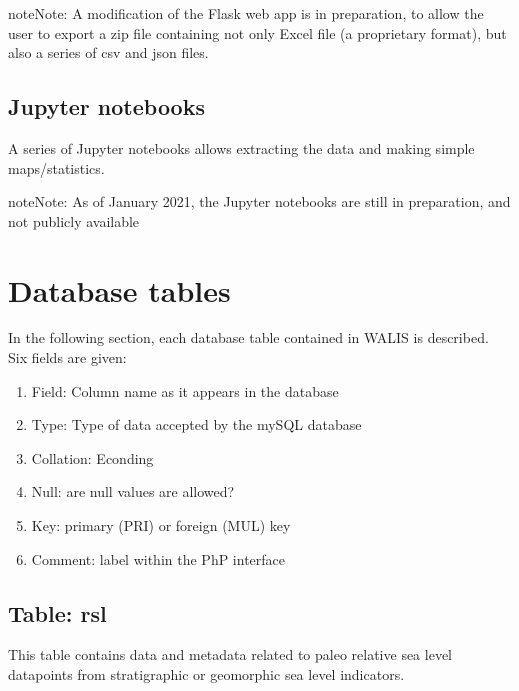 \documentclass[letterpaper,10pt,english]{sphinxmanual}
\begin{document}
\begin{sphinxadmonition}{note}{Note:}
A modification of the Flask web app is in preparation, to allow the user to export a zip file containing not only Excel file (a proprietary format), but also a series of csv and json files.
\end{sphinxadmonition}


\section{Jupyter notebooks}
\label{\detokenize{tech_data:jupyter-notebooks}}
A series of Jupyter notebooks allows extracting the data and making simple maps/statistics.

\begin{sphinxadmonition}{note}{Note:}
As of January 2021, the Jupyter notebooks are still in preparation, and not publicly available
\end{sphinxadmonition}


\chapter{Database tables}
\label{\detokenize{database:database-tables}}\label{\detokenize{database::doc}}
In the following section, each database table contained in WALIS is described. Six fields are given:
\begin{enumerate}
%
\item {} 
Field: Column name as it appears in the database

\item {} 
Type: Type of data accepted by the mySQL database

\item {} 
Collation: Econding

\item {} 
Null: are null values are allowed?

\item {} 
Key: primary (PRI) or foreign (MUL) key

\item {} 
Comment: label within the PhP interface

\end{enumerate}


\section{Table: rsl}
\label{\detokenize{database:table-rsl}}
This table contains data and metadata related to paleo relative sea level datapoints from stratigraphic or geomorphic sea level indicators.
\end{document}
